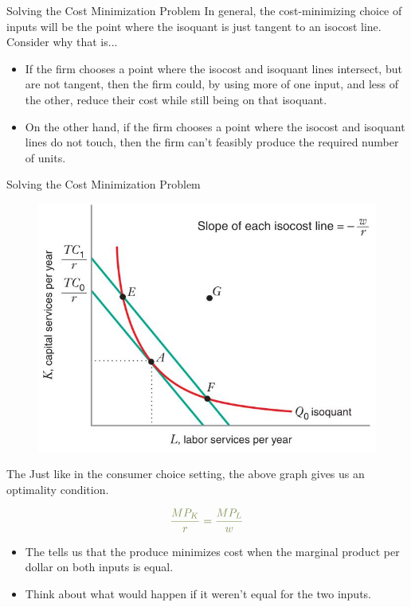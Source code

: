\documentclass[11pt,t]{beamer}
\begin{document}
\begin{frame}{Solving the Cost Minimization Problem}
  In general, the cost-minimizing choice of inputs will be the point where the isoquant is just tangent to an isocost line. Consider why that is... \pause

  \begin{itemize}
    \item If the firm chooses a point where the isocost and isoquant lines intersect, but are not tangent, then the firm could, by using more of one input, and less of the other, reduce their cost while still being on that isoquant.
    \item On the other hand, if the firm chooses a point where the isocost and isoquant lines do not touch, then the firm can't feasibly produce the required number of units.
  \end{itemize}
\end{frame}

\begin{frame}{Solving the Cost Minimization Problem}
  \begin{figure}
    \includegraphics[width=0.8\linewidth]{figures/fig7_2.jpg}
  \end{figure}
\end{frame}



\begin{frame}{The }
  Just like in the consumer choice setting, the above graph gives us an optimality condition.

  $$
    \kelly{\frac{MP_K}{r} = \frac{MP_L}{w}}
  $$

  \pause\bigskip
  \begin{itemize}
    \item The  tells us that the produce minimizes cost when the marginal product per dollar on both inputs is equal.
    \item Think about what would happen if it weren't equal for the two inputs.
  \end{itemize}
\end{frame}
\end{document}
